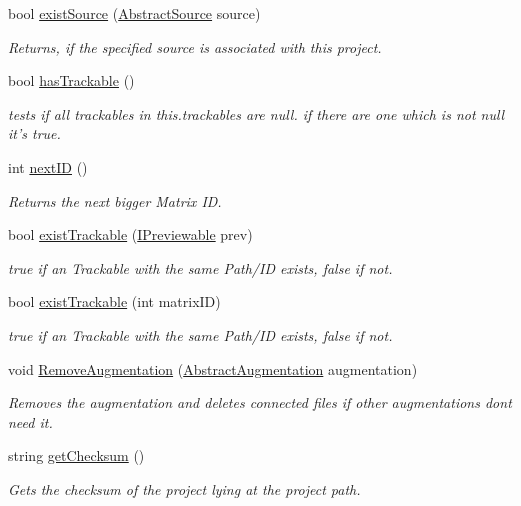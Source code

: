 \begin{DoxyCompactItemize}
bool \hyperlink{class_a_rdev_kit_1_1_model_1_1_project_1_1_project_a0efd066f58d552481f075879015e3652}{exist\-Source} (\hyperlink{class_a_rdev_kit_1_1_model_1_1_project_1_1_abstract_source}{Abstract\-Source} source)
\begin{DoxyCompactList}\small\item\em Returns, if the specified source is associated with this project. \end{DoxyCompactList}\item 
bool \hyperlink{class_a_rdev_kit_1_1_model_1_1_project_1_1_project_a97efde65dc462b98448edd6967f9e777}{has\-Trackable} ()
\begin{DoxyCompactList}\small\item\em tests if all trackables in this.\-trackables are null. if there are one which is not null it's true. \end{DoxyCompactList}\item 
int \hyperlink{class_a_rdev_kit_1_1_model_1_1_project_1_1_project_a3176ea13afc802bbb0ac63fe838823e8}{next\-I\-D} ()
\begin{DoxyCompactList}\small\item\em Returns the next bigger Matrix I\-D. \end{DoxyCompactList}\item 
bool \hyperlink{class_a_rdev_kit_1_1_model_1_1_project_1_1_project_abb0710a1f1cd83bda71a0c988e9b6d72}{exist\-Trackable} (\hyperlink{interface_a_rdev_kit_1_1_model_1_1_project_1_1_i_previewable}{I\-Previewable} prev)
\begin{DoxyCompactList}\small\item\em true if an Trackable with the same Path/\-I\-D exists, false if not. \end{DoxyCompactList}\item 
bool \hyperlink{class_a_rdev_kit_1_1_model_1_1_project_1_1_project_a4bdc5fa718a8a54711dd659d8edc1ea0}{exist\-Trackable} (int matrix\-I\-D)
\begin{DoxyCompactList}\small\item\em true if an Trackable with the same Path/\-I\-D exists, false if not. \end{DoxyCompactList}\item 
void \hyperlink{class_a_rdev_kit_1_1_model_1_1_project_1_1_project_ae7f9958ca529fd10eb489566a8adf374}{Remove\-Augmentation} (\hyperlink{class_a_rdev_kit_1_1_model_1_1_project_1_1_abstract_augmentation}{Abstract\-Augmentation} augmentation)
\begin{DoxyCompactList}\small\item\em Removes the augmentation and deletes connected files if other augmentations dont need it. \end{DoxyCompactList}\item 
string \hyperlink{class_a_rdev_kit_1_1_model_1_1_project_1_1_project_a222ab9abcfa20e2637300bbc94a8f3c2}{get\-Checksum} ()
\begin{DoxyCompactList}\small\item\em Gets the checksum of the project lying at the project path. \end{DoxyCompactList}\end{DoxyCompactItemize}
